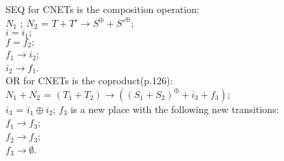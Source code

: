 SEQ for CNETs is the composition operation:\\
$N_1$ ; $N_2$ = $T + T' \to S^\oplus + S'^\oplus$;\\
$i = i_1;$\\
$f = f_2;$\\
$f_1 \to i_2$;\\
$i_2  \to f_1$.\bigskip\\
OR for CNETs is the coproduct(p.126):\\
$N_1 + N_2$ = $(T_1 + T_2) \to ((S_1 + S_2)^\oplus +  i_3 + f_3)$;\\
$i_3$  = $i_1 \oplus i_2$;
$f_3$ is a new place with the following new transitions:\\
$f_1 \to f_3$;\\
$f_2 \to f_3$;\\
$f_3 \to \emptyset$.\\

